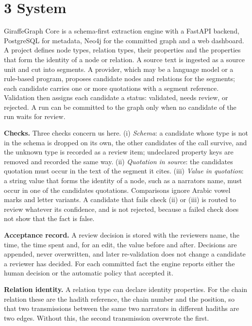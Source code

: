 \documentclass[
  english,
]{article}
\begin{document}
\section{3 System}\label{system}

GiraffeGraph Core is a schema-first extraction engine with a FastAPI
backend, PostgreSQL for metadata, Neo4j for the committed graph and a
web dashboard. A project defines node types, relation types, their
properties and the properties that form the identity of a node or
relation. A source text is ingested as a source unit and cut into
segments. A provider, which may be a language model or a rule-based
program, proposes candidate nodes and relations for the segments; each
candidate carries one or more quotations with a segment reference.
Validation then assigns each candidate a status: validated, needs
review, or rejected. A run can be committed to the graph only when no
candidate of the run waits for review.

\textbf{Checks.} Three checks concern us here. (i) \emph{Schema}: a
candidate whose type is not in the schema is dropped on its own, the
other candidates of the call survive, and the unknown type is recorded
as a review item; undeclared property keys are removed and recorded the
same way. (ii) \emph{Quotation in source}: the
candidate\textquotesingle s quotation must occur in the text of the
segment it cites. (iii) \emph{Value in quotation}: a string value that
forms the identity of a node, such as a narrator\textquotesingle s name,
must occur in one of the candidate\textquotesingle s quotations.
Comparisons ignore Arabic vowel marks and letter variants. A candidate
that fails check (ii) or (iii) is routed to review whatever its
confidence, and is not rejected, because a failed check does not show
that the fact is false.

\textbf{Acceptance record.} A review decision is stored with the
reviewer\textquotesingle s name, the time, the time spent and, for an
edit, the value before and after. Decisions are appended, never
overwritten, and later re-validation does not change a candidate a
reviewer has decided. For each committed fact the engine reports either
the human decision or the automatic policy that accepted it.

\textbf{Relation identity.} A relation type can declare identity
properties. For the chain relation these are the hadith reference, the
chain number and the position, so that two transmissions between the
same two narrators in different hadiths are two edges. Without this, the
second transmission overwrote the first.
\end{document}
